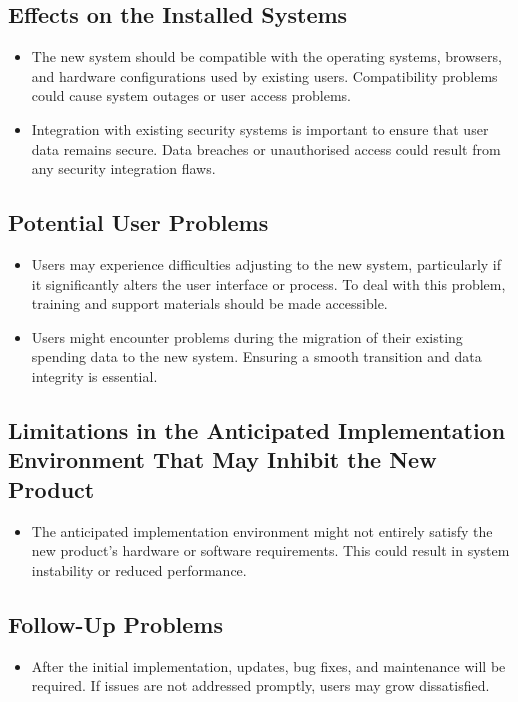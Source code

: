 \documentclass[12pt]{article}
\begin{document}
\subsection{Effects on the Installed Systems}
\begin{itemize}
    \item The new system should be compatible with the operating systems, browsers, and hardware configurations used by existing users. Compatibility problems could cause system outages or user access problems.
    \item Integration with existing security systems is important to ensure that user data remains secure. Data breaches or unauthorised access could result from any security integration flaws.
\end{itemize}
\subsection{Potential User Problems}
\begin{itemize}
    \item Users may experience difficulties adjusting to the new system, particularly if it significantly alters the user interface or process. To deal with this problem, training and support materials should be made accessible.
    \item Users might encounter problems during the migration of their existing spending data to the new system. Ensuring a smooth transition and data integrity is essential.
\end{itemize}
\subsection{Limitations in the Anticipated Implementation Environment That May
Inhibit the New Product}
\begin{itemize}
    \item The anticipated implementation environment might not entirely satisfy the new product's hardware or software requirements. This could result in system instability or reduced performance.
\end{itemize}
\subsection{Follow-Up Problems}
\begin{itemize}
    \item After the initial implementation, updates, bug fixes, and maintenance will be required. If issues are not addressed promptly, users may grow dissatisfied.
\end{itemize}
\end{document}
